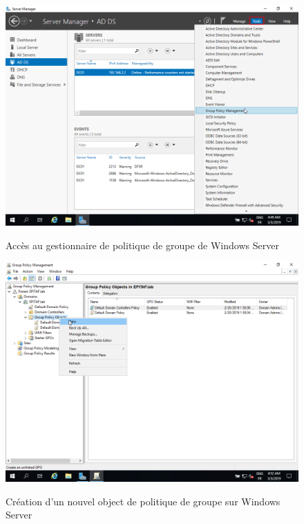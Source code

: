 \begin{figure}[h!]
	\begin{center}
		\caption{Accès au gestionnaire de politique de groupe de Windows Server}
		\includegraphics[scale=0.5]{WS_Screenshots/gpo_0.png}
		\label{WS_Screenshots/gpo_0}
	\end{center}
\end{figure}
\FloatBarrier 

\begin{figure}[h!]
	\begin{center}
		\caption{Création d'un nouvel object de politique de groupe sur Windows Server}
		\includegraphics[scale=0.5]{WS_Screenshots/gpo_1.png}
		\label{WS_Screenshots/gpo_1}
	\end{center}
\end{figure}
\FloatBarrier 
    

